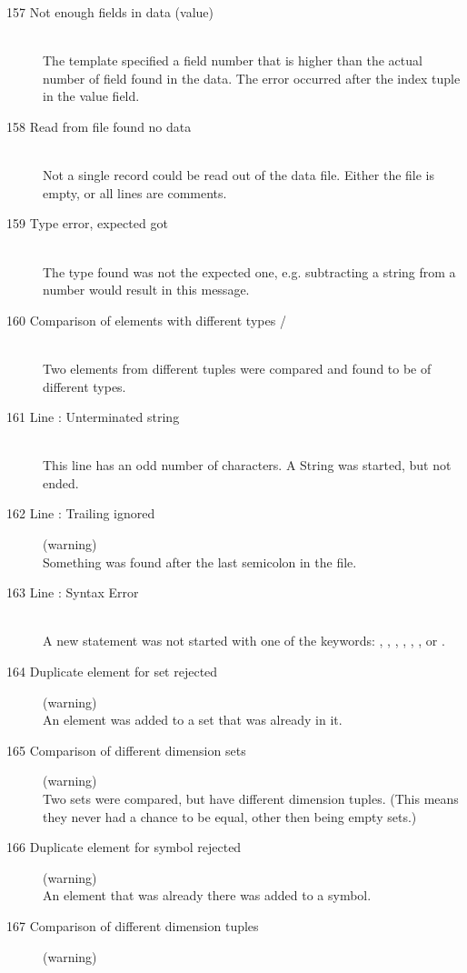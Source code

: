 \begin{description}
\item[157 Not enough fields in data (value)]\ \\
  The template specified a field number that is higher than the actual
  number of field found in the data. The error occurred after the 
  index tuple in the value field.
\item[158 Read from file found no data]\ \\
  Not a single record could be read out of the data file. Either the
  file is empty, or all lines are comments.
%
%  
\item[159 Type error, expected  got ]\ \\
  The type found was not the expected one, e.g. subtracting 
  a string from a number would result in this message.
%
% 
\item[160 Comparison of elements with different types  /
  ]\ \\
  Two elements from different tuples were compared and found to be 
  of different types. 
%
%
\item[161 Line : Unterminated string]\ \\
  This line has an odd number of  characters. 
  A String was started, but not ended.
\item[162 Line : Trailing  ignored] (warning)\ \\
  Something was found after the last semicolon in the file.
\item[163 Line : Syntax Error]\ \\
  A new statement was not started with one of the keywords:
  , , , , 
  , , or .
%
%
\item[164 Duplicate element  for set rejected] (warning)\ \\
   An element was added to a set that was already in it.
\item[165 Comparison of different dimension sets] (warning)\ \\
   Two sets were compared, but have different dimension tuples.
   (This means they never had a chance to
   be equal, other then being empty sets.)
%
%
\item[166 Duplicate element  for symbol  rejected]
   (warning)\ \\
  An element that was already there was added to a symbol.
%
%
\item[167 Comparison of different dimension tuples] (warning)\ \\

\end{description}
